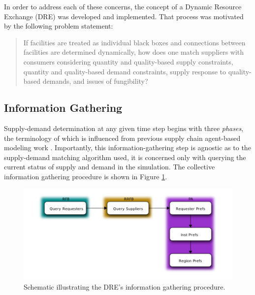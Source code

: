 In order to address each of these concerns, the concept of a Dynamic Resource
Exchange (DRE) was developed and implemented. That process was motivated by the
following problem statement:

\begin{quote}
    If facilities are treated as individual black boxes and connections between
    facilities are determined dynamically, how does one match suppliers with
    consumers considering quantity and quality-based supply constraints,
    quantity and quality-based demand constraints, supply response to
    quality-based demands, and issues of fungibility?
\end{quote}

\subsection{Information Gathering}\label{abm:dre:info}

Supply-demand determination at any given time step begins with three
\textit{phases}, the terminology of which is influenced from previous supply
chain agent-based modeling work \cite{julka_agent-based_2002}. Importantly, this
information-gathering step is agnostic as to the supply-demand matching
algorithm used, it is concerned only with querying the current status of supply
and demand in the simulation. The collective information gathering procedure is
shown in Figure \ref{fig:procedure}.

\begin{figure}
  \begin{center}
    \includegraphics[]{./figs/procedure.pdf}
    \caption[]{\label{fig:procedure}
        Schematic illustrating the DRE's information gathering procedure.}
  \end{center}
\end{figure}

